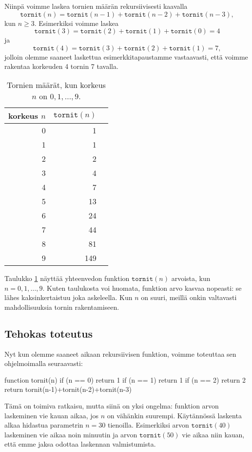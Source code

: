 Niinpä voimme laskea tornien määrän rekursiivisesti kaavalla
\[
\texttt{tornit}(n) = \texttt{tornit}(n-1)+\texttt{tornit}(n-2)+\texttt{tornit}(n-3),
\]
kun $n \ge 3$.
Esimerkiksi voimme laskea
\[
\texttt{tornit}(3) = \texttt{tornit}(2)+\texttt{tornit}(1)+\texttt{tornit}(0)=4
\]
ja
\[
\texttt{tornit}(4) = \texttt{tornit}(3)+\texttt{tornit}(2)+\texttt{tornit}(1)=7,
\]
jolloin olemme saaneet laskettua esimerkkitapaustamme vastaavasti,
että voimme rakentaa korkeuden 4 tornin 7 tavalla.

\begin{table}
\center
\begin{tabular}{rrr}
korkeus $n$ & $\texttt{tornit}(n)$ \\
\hline
0 & 1 \\
1 & 1 \\
2 & 2 \\
3 & 4 \\
4 & 7 \\
5 & 13 \\
6 & 24 \\
7 & 44 \\
8 & 81 \\
9 & 149 \\
\end{tabular}
\caption{Tornien määrät, kun korkeus $n$ on $0,1,\dots,9$.}
\label{tab:dyntor}
\end{table}

Taulukko \ref{tab:dyntor} näyttää yhteenvedon funktion
$\texttt{tornit}(n)$ arvoista, kun $n=0,1,\dots,9$.
Kuten taulukosta voi huomata, funktion arvo kasvaa nopeasti:
se lähes kaksinkertaistuu joka askeleella.
Kun $n$ on suuri,
meillä onkin valtavasti mahdollisuuksia tornin rakentamiseen.

\subsection{Tehokas toteutus}

Nyt kun olemme saaneet aikaan rekursiivisen funktion,
voimme toteuttaa sen ohjelmoimalla seuraavasti:

\begin{code}
function tornit(n)
    if (n == 0) return 1
    if (n == 1) return 1
    if (n == 2) return 2
    return tornit(n-1)+tornit(n-2)+tornit(n-3)
\end{code}

Tämä on toimiva ratkaisu, mutta siinä on yksi ongelma:
funktion arvon laskeminen vie kauan aikaa, jos $n$ on
vähänkin suurempi.
Käytännössä laskenta alkaa hidastua parametrin $n=30$ tienoilla.
Esimerkiksi arvon $\texttt{tornit}(40)$ laskeminen vie aikaa
noin minuutin ja arvon $\texttt{tornit}(50)$ vie aikaa niin kauan,
että emme jaksa odottaa laskennan valmistumista.

